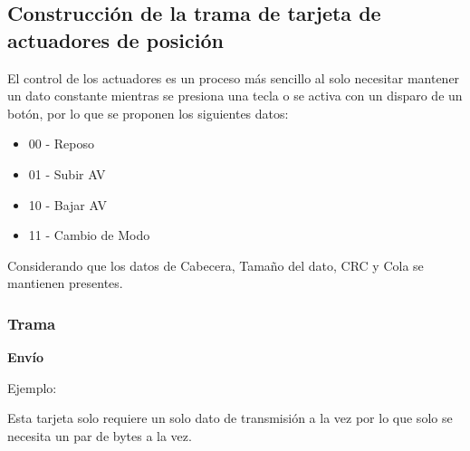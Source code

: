\documentclass[12pt,a4paper]{article}
\begin{document}
                \begin{twocolsection}
            \subsection{Construcción de la trama de tarjeta de actuadores de posición}
            El control de los actuadores es un proceso más sencillo al solo necesitar mantener un dato constante mientras se presiona una tecla o se activa con un disparo de un botón, por lo que se proponen los siguientes datos:

            \begin{itemize}
                \item 00 - Reposo
                \item 01 - Subir AV
                \item 10 - Bajar AV
                \item 11 - Cambio de Modo
            \end{itemize}

            Considerando que los datos de Cabecera, Tamaño del dato, CRC y Cola se mantienen presentes.
        \end{twocolsection}

        \subsubsection{Trama}
            \textbf{\normalsize{Envío}}
                \begin{center}
                \end{center}
        
                Ejemplo:
                
                \begin{center}
                \end{center}
                
                Esta tarjeta solo requiere un solo dato de transmisión a la vez por lo que solo se necesita un par de bytes a la vez.
        
\end{document}
